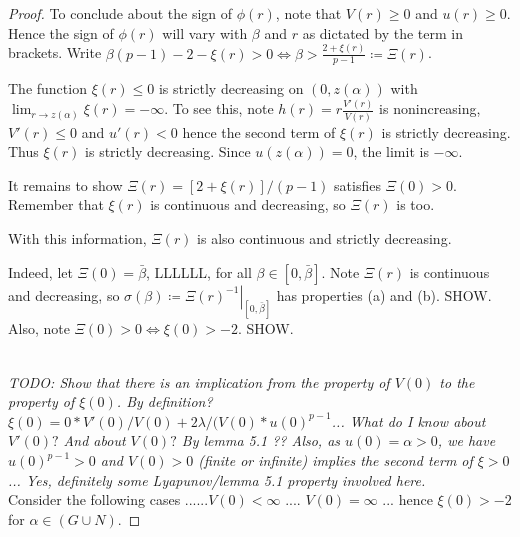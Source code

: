 \begin{lemma}
\begin{proof}
\seperate

To conclude about the sign of $\phi(r)$, note that $V(r)\geq0$ and $u(r)\geq0$.
Hence the sign of $\phi(r)$ will vary with $\beta$ and $r$ as dictated by the term in brackets.
Write $\beta(p-1)-2-\xi(r)>0\iff\beta>\frac{2+\xi(r)}{p-1}\coloneqq\Xi(r)$.

The function $\xi(r)\leq0$ is strictly decreasing on $(0,z(\alpha))$
with $\lim_{r\to z(\alpha)}\xi(r)=-\infty$. {\color{red}
To see this, note $h(r)=r\frac{V'(r)}{V(r)}$ is nonincreasing,
$V'(r)\leq0$ and $u'(r)<0$ hence the second term of $\xi(r)$ is strictly decreasing.
Thus $\xi(r)$ is strictly decreasing.
Since $u(z(\alpha))=0$, the limit is $-\infty$.}

It remains to show $\Xi(r)=\left[2+\xi(r)\right]/(p-1)$ satisfies $\Xi(0)>0$.
Remember that $\xi(r)$ is continuous and decreasing, so $\Xi(r)$ is too. \\

\seperate

With this information, $\Xi(r)$ is also continuous and strictly decreasing.

Indeed, let $\Xi(0)=\bar\beta$, LLLLLL, for all $\beta\in[0,\bar\beta]$.
Note $\Xi(r)$ is continuous and decreasing, so
$\sigma(\beta)\coloneqq\left.\Xi(r)^{-1}\right|_{[0,\bar\beta]}$
has properties (a) and (b). SHOW. \\

Also, note $\Xi(0)>0\iff\xi(0)>-2$. SHOW.\\

\seperate

\emph{}\\[11pt]\emph{TODO: Show that there is an implication from the property of $V(0)$ to the property of $\xi(0)$. By definition? $\xi(0) = 0 * V'(0)/V(0) + 2\lambda / (V(0)*u(0)^{p-1}$... What do I know about $V'(0)?$ And about $V(0)?$ By lemma 5.1 ?? Also, as $u(0)=\alpha>0$, we have $u(0)^{p-1}>0$ and $V(0)>0$ (finite or infinite) implies the second term of $\xi > 0$... Yes, definitely some Lyapunov/lemma 5.1 property involved here.}\\[11pt]
Consider the following cases ......$V(0)<\infty$ .... $V(0)=\infty$ ... hence $\xi(0)>-2$ for $\alpha\in(G\cup N)$.

\end{proof}
\end{lemma}
